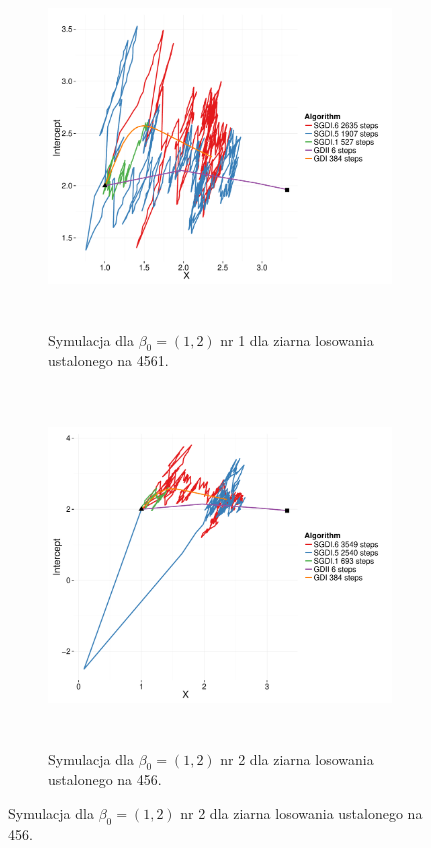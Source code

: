 \begin{figure}[hbt!]
  \begin{center}
   \begin{subfigure}[h!]{0.9\textwidth}
      \includegraphics[width=\textwidth, height=270pt]{Obrazki/sgd_1_2_1.pdf}
      \caption{Symulacja dla $\beta_0 = (1,2)$ nr 1 dla ziarna losowania ustalonego na 4561.}
   \end{subfigure}     
   \begin{subfigure}[h!]{0.9\textwidth}
      \includegraphics[width=\textwidth, height=270pt]{Obrazki/sgd_1_2_2.pdf}
      \caption{Symulacja dla $\beta_0 = (1,2)$ nr 2 dla ziarna losowania ustalonego na 456.}
   \end{subfigure}  \end{center}

\end{figure}

